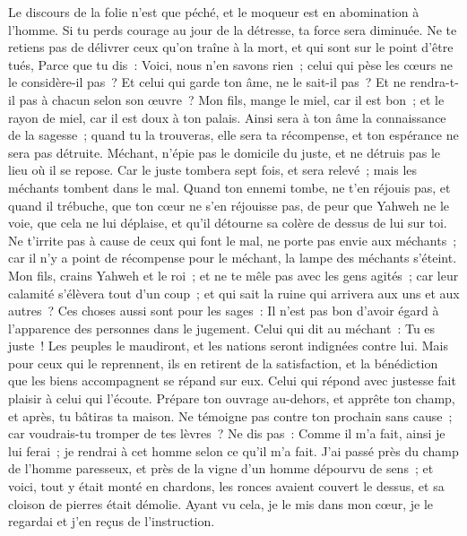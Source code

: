 \begin{multicols}{2}
Le discours de la folie n'est que péché, et le moqueur est en abomination à l'homme.
Si tu perds courage au jour de la détresse, ta force sera diminuée.
Ne te retiens pas de délivrer ceux qu'on traîne à la mort, et qui sont sur le point d'être tués,
Parce que tu dis~: Voici, nous n'en savons rien~; celui qui pèse les cœurs ne le considère-il pas~? Et celui qui garde ton âme, ne le sait-il pas~? Et ne rendra-t-il pas à chacun selon son œuvre~?
Mon fils, mange le miel, car il est bon~; et le rayon de miel, car il est doux à ton palais.
Ainsi sera à ton âme la connaissance de la sagesse~; quand tu la trouveras, elle sera ta récompense, et ton espérance ne sera pas détruite.
Méchant, n'épie pas le domicile du juste, et ne détruis pas le lieu où il se repose.
Car le juste tombera sept fois, et sera relevé~; mais les méchants tombent dans le mal.
Quand ton ennemi tombe, ne t'en réjouis pas, et quand il trébuche, que ton cœur ne s'en réjouisse pas,
de peur que Yahweh ne le voie, que cela ne lui déplaise, et qu'il détourne sa colère de dessus de lui sur toi.
Ne t'irrite pas à cause de ceux qui font le mal, ne porte pas envie aux méchants~;
car il n'y a point de récompense pour le méchant, la lampe des méchants s'éteint.
Mon fils, crains Yahweh et le roi~; et ne te mêle pas avec les gens agités~;
car leur calamité s'élèvera tout d'un coup~; et qui sait la ruine qui arrivera aux uns et aux autres~?
Ces choses aussi sont pour les sages~: Il n'est pas bon d'avoir égard à l'apparence des personnes dans le jugement.
Celui qui dit au méchant~: Tu es juste~! Les peuples le maudiront, et les nations seront indignées contre lui.
Mais pour ceux qui le reprennent, ils en retirent de la satisfaction, et la bénédiction que les biens accompagnent se répand sur eux.
Celui qui répond avec justesse fait plaisir à celui qui l'écoute.
Prépare ton ouvrage au-dehors, et apprête ton champ, et après, tu bâtiras ta maison.
Ne témoigne pas contre ton prochain sans cause~; car voudrais-tu tromper de tes lèvres~?
Ne dis pas~: Comme il m'a fait, ainsi je lui ferai~; je rendrai à cet homme selon ce qu'il m'a fait.
J'ai passé près du champ de l'homme paresseux, et près de la vigne d'un homme dépourvu de sens~;
et voici, tout y était monté en chardons, les ronces avaient couvert le dessus, et sa cloison de pierres était démolie.
Ayant vu cela, je le mis dans mon cœur, je le regardai et j'en reçus de l'instruction.

\end{multicols}
